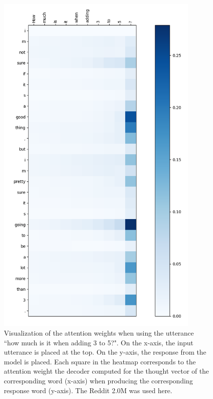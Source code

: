 \begin{figure}[H]
	\centering
	\includegraphics[width=10cm]{img/attention/attention_visualization2_reddit_2m.png}
	\caption{Visualization of the attention weights when using the utterance ``how much is it when adding 3 to 5?". On the x-axis, the input utterance is placed at the top. On the y-axis, the response from the model is placed. Each square in the heatmap corresponds to the attention weight the decoder computed for the thought vector of the corresponding word (x-axis) when producing the corresponding response word (y-axis). The Reddit 2.0M was used here.}
	\label{results:attention:example2:reddit}
\end{figure}

